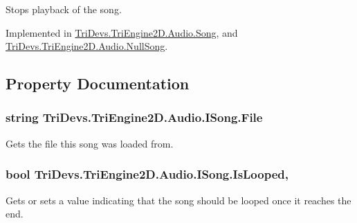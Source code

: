 Stops playback of the song. 



Implemented in \hyperlink{class_tri_devs_1_1_tri_engine2_d_1_1_audio_1_1_song_a24edfbb8f48ece05a9f94b23843778a5}{Tri\-Devs.\-Tri\-Engine2\-D.\-Audio.\-Song}, and \hyperlink{class_tri_devs_1_1_tri_engine2_d_1_1_audio_1_1_null_song_aa5498f4a12aeeead219f9f4b6e08faaf}{Tri\-Devs.\-Tri\-Engine2\-D.\-Audio.\-Null\-Song}.



\subsection{Property Documentation}
\hypertarget{interface_tri_devs_1_1_tri_engine2_d_1_1_audio_1_1_i_song_a5610c3ab21ec36403c5a632a24a57c54}{
\subsubsection[{File}]{\setlength{\rightskip}{0pt plus 5cm}string Tri\-Devs.\-Tri\-Engine2\-D.\-Audio.\-I\-Song.\-File\hspace{0.3cm}{\ttfamily [get]}}}\label{interface_tri_devs_1_1_tri_engine2_d_1_1_audio_1_1_i_song_a5610c3ab21ec36403c5a632a24a57c54}


Gets the file this song was loaded from. 

\hypertarget{interface_tri_devs_1_1_tri_engine2_d_1_1_audio_1_1_i_song_a6a5eeb5f1f6418fda045baeba034e734}{
\subsubsection[{Is\-Looped}]{\setlength{\rightskip}{0pt plus 5cm}bool Tri\-Devs.\-Tri\-Engine2\-D.\-Audio.\-I\-Song.\-Is\-Looped\hspace{0.3cm}{\ttfamily [get]}, {\ttfamily [set]}}}\label{interface_tri_devs_1_1_tri_engine2_d_1_1_audio_1_1_i_song_a6a5eeb5f1f6418fda045baeba034e734}


Gets or sets a value indicating that the song should be looped once it reaches the end. 

